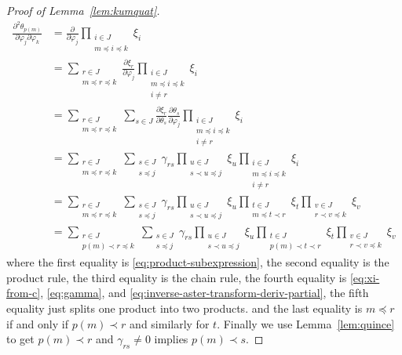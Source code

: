 \begin{proof}[Proof of Lemma~\ref{lem:kumquat}]
\begin{align*}
   \frac{\partial^2 \theta_{p(m)}}{\partial \varphi_j \partial \varphi_k}
   & =
   \frac{\partial}{\partial \varphi_j}
   \prod_{\substack{i \in J \\ m \preceq i \preceq k}} \xi_i
   \\
   & =
   \sum_{\substack{r \in J \\ m \preceq r \preceq k}}
   \frac{\partial \xi_r}{\partial \varphi_j}
   \prod_{\substack{i \in J \\ m \preceq i \preceq k \\ i \neq r}} \xi_i
   \\
   & =
   \sum_{\substack{r \in J \\ m \preceq r \preceq k}}
   \sum_{s \in J}
   \frac{\partial \xi_r}{\partial \theta_s}
   \frac{\partial \theta_s}{\partial \varphi_j}
   \prod_{\substack{i \in J \\ m \preceq i \preceq k \\ i \neq r}} \xi_i
   \\
   & =
   \sum_{\substack{r \in J \\ m \preceq r \preceq k}}
   \sum_{\substack{s \in J \\ s \preceq j}}
   \gamma_{r s}
   \prod_{\substack{u \in J \\ s \prec u \preceq j}} \xi_u
   \prod_{\substack{i \in J \\ m \preceq i \preceq k \\ i \neq r}} \xi_i
   \\
   & =
   \sum_{\substack{r \in J \\ m \preceq r \preceq k}}
   \sum_{\substack{s \in J \\ s \preceq j}}
   \gamma_{r s}
   \prod_{\substack{u \in J \\ s \prec u \preceq j}} \xi_u
   \prod_{\substack{t \in J \\ m \preceq t \prec r}} \xi_t
   \prod_{\substack{v \in J \\ r \prec v \preceq k}} \xi_v
   \\
   & =
   \sum_{\substack{r \in J \\ p(m) \prec r \preceq k}}
   \sum_{\substack{s \in J \\ s \preceq j}}
   \gamma_{r s}
   \prod_{\substack{u \in J \\ s \prec u \preceq j}} \xi_u
   \prod_{\substack{t \in J \\ p(m) \prec t \prec r}} \xi_t
   \prod_{\substack{v \in J \\ r \prec v \preceq k}} \xi_v
\end{align*}
where the first equality is \eqref{eq:product-subexpression},
the second equality is the product rule,
the third equality is the chain rule,
the fourth equality is \eqref{eq:xi-from-c}, \eqref{eq:gamma}, and
\eqref{eq:inverse-aster-transform-deriv-partial},
the fifth equality just splits one product into two products.
and the last equality is $m \preceq r$ if and only if $p(m) \prec r$
and similarly for $t$.  Finally we use Lemma~\ref{lem:quince} to get
$p(m) \prec r$ and $\gamma_{r s} \neq 0$ implies $p(m) \prec s$.


\end{proof}
